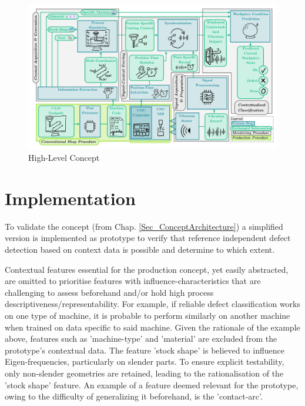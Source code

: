 \documentclass[5p,times,procedia]{elsarticle}
\begin{document}
\begin{figure}[t]
    \centering
    \includegraphics[width=0.99\linewidth]{ConceptDiagram.pdf}
    \caption{High-Level Concept}
    \label{Fig_ConceptDiagram}
\end{figure}
 





\section{Implementation}

To validate the concept (from Chap. \ref{Sec_ConceptArchitecture}) a simplified version is implemented as prototype to verify that reference independent defect detection based on context data is possible and determine to which extent.

Contextual features essential for the production concept, yet easily abstracted, are omitted to prioritise features with influence-characteristics that are challenging to assess beforehand and/or hold high process descriptiveness/representability. For example, if reliable defect classification works on one type of machine, it is probable to perform similarly on another machine when trained on data specific to said machine.
Given the rationale of the example above, features such as 'machine-type' and 'material' are excluded from the prototype's contextual data.
The feature 'stock shape' is believed to influence Eigen-frequencies, particularly on slender parts. To ensure explicit testability, only non-slender geometries are retained, leading to the rationalisation of the 'stock shape' feature.
An example of a feature deemed relevant for the prototype, owing to the difficulty of generalizing it beforehand, is the 'contact-arc'.
\end{document}
